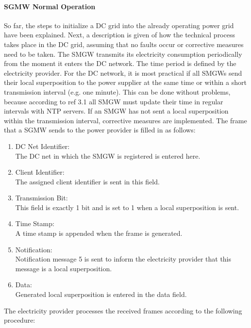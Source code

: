 \\
\textbf{SGMW Normal Operation}
\\
\\
So far, the steps to initialize a DC grid into the already operating power grid have been explained. Next, a description is given of how the technical process takes place in the DC grid, assuming that no faults occur or corrective measures need to be taken. The SMGW transmits its electricity consumption periodically from the moment it enters the DC network. The time period is defined by the electricity provider. For the DC network, it is most practical if all SMGWs send their local superposition to the power supplier at the same time or within a short transmission interval (e.g. one minute). This can be done without problems, because according to ref 3.1 all SMGW must update their time in regular intervals with NTP servers. If an SMGW has not sent a local superposition within the transmission interval, corrective measures are implemented. The frame that a SGMW sends to the power provider is filled in as follows:
\begin{enumerate}
\item DC Net Identifier:\\
The DC net in which the SMGW is registered is entered here.
\item Client Identifier:\\ 
The assigned client identifier is sent in this field.
\item Transmission Bit:\\
This field is exactly 1 bit and is set to 1 when a local superposition is sent.
\item Time Stamp:\\
A time stamp is appended when the frame is generated.
\item Notification:\\
Notification message 5 is sent to inform the electricity provider that this message is a local superposition.
\item Data:\\
Generated local superposition is entered in the data field.
\end{enumerate}
The electricity provider processes the received frames according to the following procedure:\\
